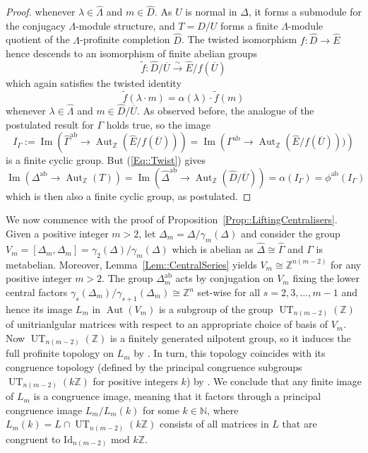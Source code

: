 \documentclass{amsart}
\numberwithin{theorem}{section}
\numberwithin{equation}{section}
\newcommand{\Z}{\mathbb{Z}}
\newcommand{\hD}{\widehat{\Delta}}
\newcommand{\hG}{\widehat{\Gamma}}
\begin{document}
\begin{proof}
whenever $\lambda \in \widehat{\Lambda}$ and $m \in \widehat{D}$. As $U$ is normal in $\Delta$, it forms a submodule for the conjugacy $\Lambda$-module structure, and $T = D/U$ forms a finite $\Lambda$-module quotient of the $\Lambda$-profinite completion $\widehat{D}$. The twisted isomorphism $f \colon \widehat{D} \to \widehat{E}$ hence descends to an isomorphism of finite abelian groups
\[
\widetilde{f} \colon \widehat{D}/\overline{U} \xrightarrow{\sim} \widehat{E}/f(\overline{U})
\]
which again satisfies the twisted identity
\begin{equation}\label{Eq::Twist}
    \widetilde f(\lambda \cdot m) = \alpha(\lambda) \cdot\widetilde f(m) 
\end{equation}
whenever $\lambda \in \widehat{\Lambda}$ and $m \in \widehat{D}/\overline{U}$. As observed before, the analogue of the postulated result for $\Gamma$ holds true, so the image 
\[
I_\Gamma := \operatorname{Im}\left(\hG^\mathrm{ab} \to \operatorname{Aut}_\Z(\widehat E/f(\overline U))\right) = \operatorname{Im}\left(\Gamma^\mathrm{ab} \to \operatorname{Aut}_\Z(\widehat E/f(\overline U)))\right)
\]
is a finite cyclic group. But (\ref{Eq::Twist}) gives
\[
\operatorname{Im}\left(\Delta^\mathrm{ab} \to \operatorname{Aut}_\Z(T)\right) = \operatorname{Im}\left(\widehat \Delta^\mathrm{ab} \to \operatorname{Aut}_\Z(\widehat D/\overline U)\right) = \alpha(I_\Gamma) = \phi^\mathrm{ab}(I_\Gamma)
\]
which is then also a finite cyclic group, as postulated.
\end{proof}

We now commence with the proof of Proposition~\ref{Prop::LiftingCentralisers}. Given a positive integer $m > 2$, let $\Delta_m=\Delta/\gamma_m(\Delta)$ and consider the group $V_m=[\Delta_m,\Delta_m]=\gamma_2(\Delta)/\gamma_m(\Delta)$ which is abelian as $\hD \cong \hG$ and $
\Gamma$ is metabelian. Moreover, Lemma~\ref{Lem::CentralSeries} yields $V_m \cong \Z^{n(m-2)}$ for any positive integer $m >2$. The group $\Delta_m^\mathrm{ab}$ acts by conjugation on $V_m$ fixing the lower central factors $\gamma_s(\Delta_m)/\gamma_{s+1}(\Delta_m) \cong \Z^n$ set-wise for all $s=2,3, \ldots ,m-1$ and hence its image $L_m$ in $\operatorname{Aut}(V_m)$ is a subgroup of the group $\operatorname{UT}_{n(m-2)}(\Z)$ of unitrianlgular matrices with respect to an appropriate choice of basis of $V_m$. Now $\operatorname{UT}_{n(m-2)}(\Z)$ is a finitely generated nilpotent group, so it induces the full profinite topology on $L_m$ by \cite[pp. 223]{Segal1983}. In turn, this topology coincides with its congruence topology (defined by the principal congruence subgroups $\operatorname{UT}_{n(m-2)}(k \Z)$ for positive integers $k$) by \cite[Theorem 5]{Formanek1976}. We conclude that any finite image of $L_m$ is a congruence image, meaning that it factors through a principal congruence image $L_m/L_m(k)$ for some $k \in \mathbb{N}$, where $L_m(k)=L \cap \operatorname{UT}_{n(m-2)}(k \Z)$ consists of all matrices in $L$ that are congruent to $\mathrm{Id}_{n(m-2)}$ mod $k\Z$.
\end{document}
